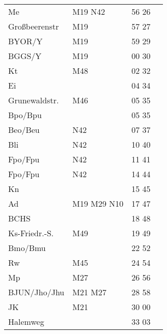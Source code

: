 \begin{tabular}{!{\color{schiefergrau}\vrule width 3pt}*{4}{l!{\color{schiefergrau}\vrule width 3pt}}}
Me           & \nusechs{} \mbus{} M19 \nbus{} N42          & 56 26 &       \\
Großbeerenstr& \mbus{} M19                                 & 57 27 &       \\
BYOR/Y       & \mbus{} M19                                 & 59 29 &       \\
BGGS/Y       & \mbus{} M19                                 & 00 30 &       \\
Kt           & \mbus{} M48                                 & 02 32 &       \\
Ei           &                                             & 04 34 &       \\
Grunewaldstr.& \mbus{} M46                                 & 05 35 &       \\
Bpo/Bpu      &                                             & 05 35 &       \\
Beo/Beu      & \nuneun{} \nbus{} N42                       & 07 37 &       \\
Bli          & \nbus{} N42                                 & 10 40 &       \\
Fpo/Fpu      & \nudrei{} \nbus{} N42                       & 11 41 &       \\
\hline
Fpo/Fpu      & \nudrei{} \nbus{} N42                       & 14 44 &       \\
Kn           &                                             & 15 45 &       \\
Ad           & \mbus{} M19 M29 \nbus{} N10                 & 17 47 &       \\
BCHS         &                                             & 18 48 &       \\
Ks-Friedr.-S.& \mbus{} M49                                 & 19 49 &       \\
Bmo/Bmu      & \nuzwei{}                                   & 22 52 &       \\
Rw           & \mbus{} M45                                 & 24 54 &       \\
Mp           & \mbus{} M27                                 & 26 56 &       \\
BJUN/Jho/Jhu & \mbus{} M21 M27                             & 28 58 &       \\
JK           & \mbus{} M21                                 & 30 00 &       \\
Halemweg     &                                             & 33 03 &       \\

\end{tabular}

